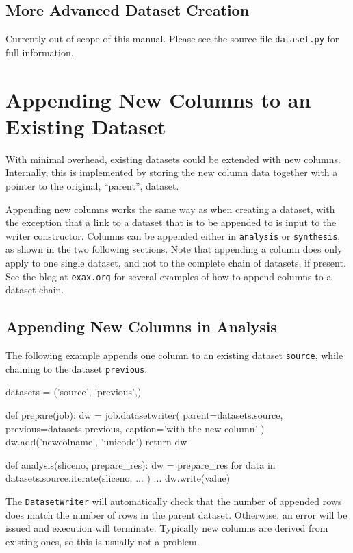 \subsection{More Advanced Dataset Creation}
Currently out-of-scope of this manual.  Please see the source file
\texttt{dataset.py} for full information.



\section{Appending New Columns to an Existing Dataset}
\label{sec:appending_new_columns}

With minimal overhead, existing datasets could be extended with new
columns.  Internally, this is implemented by storing the new column
data together with a pointer to the original, ``parent'', dataset.

Appending new columns works the same way as when creating a dataset,
with the exception that a link to a dataset that is to be appended to
is input to the writer constructor.  Columns can be appended either
in \texttt{analysis} or \texttt{synthesis}, as shown in the two
following sections.  Note that appending a column does only apply to
one single dataset, and not to the complete chain of datasets, if
present.  See the blog at \texttt{exax.org} for several examples of
how to append columns to a dataset chain.


\subsection{Appending New Columns in Analysis}

The following example appends one column to an existing
dataset \texttt{source}, while chaining to the
dataset \texttt{previous}.
\begin{python}
datasets = ('source', 'previous',)

def prepare(job):
    dw = job.datasetwriter(
        parent=datasets.source,
        previous=datasets.previous,
        caption='with the new column'
    )
    dw.add('newcolname', 'unicode')
    return dw

def analysis(sliceno, prepare_res):
    dw = prepare_res
    for data in datasets.source.iterate(sliceno, ... )
        ...
        dw.write(value)
\end{python}
The \texttt{DatasetWriter} will automatically check that the number of
appended rows does match the number of rows in the parent dataset.
Otherwise, an error will be issued and execution will terminate.
Typically new columns are derived from existing ones, so this is
usually not a problem.


